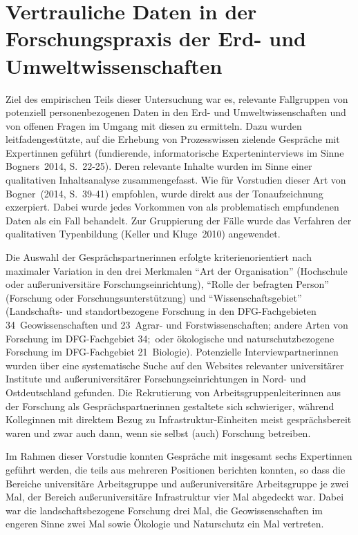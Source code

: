 \documentclass[a4paper,
fontsize=11pt,
oneside,
numbers=noperiodatend,
parskip=half-,
bibliography=totoc,
final
]{scrartcl}
\begin{document}
\hypertarget{vertrauliche-daten-in-der-forschungspraxis-der-erd--und-umweltwissenschaften}{%
\section{Vertrauliche Daten in der Forschungspraxis der Erd- und Umweltwissenschaften}\label{vertrauliche-daten-in-der-forschungspraxis-der-erd--und-umweltwissenschaften}}

Ziel des empirischen Teils dieser Untersuchung war es, relevante
Fallgruppen von potenziell personenbezogenen Daten in den Erd- und
Umweltwissenschaften und von offenen Fragen im Umgang mit diesen zu
ermitteln. Dazu wurden leitfadengestützte, auf die Erhebung von
Prozesswissen zielende Gespräche mit Expertinnen geführt (fundierende,
informatorische Experteninterviews im Sinne Bogners~2014, S.~22-25).
Deren relevante Inhalte wurden im Sinne einer qualitativen
Inhaltsanalyse zusammengefasst. Wie für Vorstudien dieser Art von
Bogner~(2014, S.~39-41) empfohlen, wurde direkt aus der Tonaufzeichnung
exzerpiert. Dabei wurde jedes Vorkommen von als problematisch
empfundenen Daten als ein Fall behandelt. Zur Gruppierung der Fälle
wurde das Verfahren der qualitativen Typenbildung (Keller und
Kluge~2010) angewendet.

Die Auswahl der Gesprächspartnerinnen erfolgte kriterienorientiert nach
maximaler Variation in den drei Merkmalen \enquote{Art der Organisation}
(Hochschule oder außeruniversitäre Forschungseinrichtung),
\enquote{Rolle der befragten Person} (Forschung oder
Forschungsunterstützung) und \enquote{Wissenschaftsgebiet} (Landschafts-
und standortbezogene Forschung in den DFG-Fachge\-bieten
34~Geowissenschaften und 23~Agrar- und Forstwissenschaften; andere Arten
von Forschung im DFG-Fachgebiet 34;~oder ökologische und
naturschutzbezogene Forschung im DFG-Fachgebiet 21~Biologie).
Potenzielle Interviewpartnerinnen wurden über eine systematische Suche
auf den Websites relevanter universitärer Institute und
außeruniversitärer Forschungseinrichtungen in Nord- und Ostdeutschland
gefunden. Die Rekrutierung von Arbeitsgruppenleiterinnen aus der
Forschung als Gesprächspartnerinnen gestaltete sich schwieriger, während
Kolleginnen mit direktem Bezug zu Infrastruktur-Einheiten meist
gesprächsbereit waren und zwar auch dann, wenn sie selbst (auch)
Forschung betreiben.

Im Rahmen dieser Vorstudie konnten Gespräche mit insgesamt sechs
Expertinnen geführt werden, die teils aus mehreren Positionen berichten
konnten, so dass die Bereiche universitäre Arbeitsgruppe und
außeruniversitäre Arbeitsgruppe je zwei Mal, der Bereich
außeruniversitäre Infrastruktur vier Mal abgedeckt war. Dabei war die
landschaftsbezogene Forschung drei Mal, die Geowissenschaften im engeren
Sinne zwei Mal sowie Ökologie und Naturschutz ein Mal vertreten.
\end{document}
